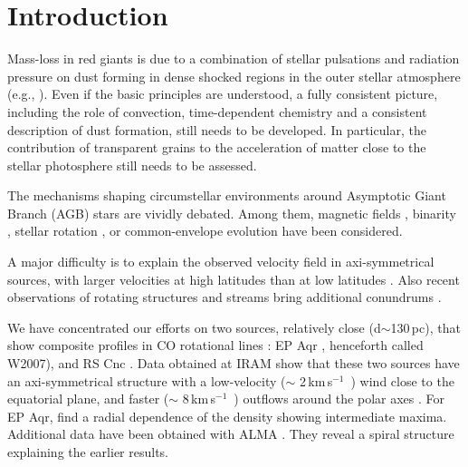 \documentclass{aa}
\newcommand{\kms}{\,km\,s$^{-1}$~}
\begin{document}

   \maketitle
%


\section{Introduction}

Mass-loss in red giants is due to a combination of stellar pulsations
and radiation pressure on dust forming in dense shocked regions in the
outer stellar atmosphere (e.g., \citet{ho18}).  Even if the basic
principles are understood, a fully consistent picture, including the
role of convection, time-dependent chemistry and a consistent
description of dust formation, still needs to be developed.  In
particular, the contribution of transparent grains to the acceleration
of matter close to the stellar photosphere \citep{ntietal2012}  still
needs to be assessed.

The mechanisms shaping circumstellar environments around Asymptotic
Giant Branch (AGB) stars are vividly debated. Among them, magnetic
fields \citep{mbwg2000,dhwbetal2017}, binarity
\citep{tj93,mm99,dmrgh2020}, stellar rotation \citep{dh96}, or
common-envelope evolution \citep{ovmetal2015,gp2018} have been
considered. 

A major difficulty is to explain the observed velocity field in
axi-symmetrical sources, with larger velocities at high latitudes than
at low latitudes \citep{hmwng14,nhwetal2015}. Also recent
observations of rotating structures and streams bring additional
conundrums \citep{thnetal2019,hntetal2019}. 

We have concentrated our efforts on two sources, relatively close
(d$\sim$130\,pc), that show composite profiles in CO rotational lines
\citep{wljne2003}: EP Aqr \citep{wlpn2007}, henceforth called W2007),
and RS Cnc \citep{lwlgm2010}.  Data obtained at IRAM show that these
two sources have an axi-symmetrical structure with a low-velocity
($\sim$ 2\kms) wind close to the equatorial plane, and faster ($\sim$
8\kms) outflows around the polar axes \citep{hmwng14,nhwetal2015}.
For EP Aqr,  find a radial dependence of the
density showing intermediate maxima.  Additional data have been
obtained with ALMA \citep{nht2019,hrddk2018}.  They reveal a spiral
structure explaining the earlier  results. 
\end{document}
